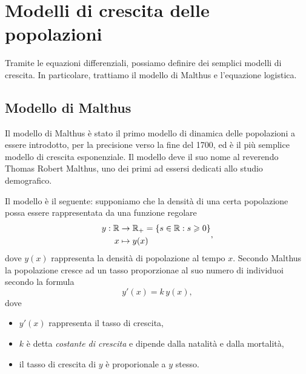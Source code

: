 \documentclass[../../analisi2]{subfiles}
\begin{document}
    \chapter{Modelli di crescita delle popolazioni}

        Tramite le equazioni differenziali, possiamo definire dei semplici modelli di crescita. In particolare, trattiamo il modello
        di Malthus e l'equazione logistica.

        \section{Modello di Malthus}

            Il modello di Malthus è stato il primo modello di dinamica delle popolazioni a essere introdotto, per la precisione verso la
            fine del 1700, ed è il più semplice modello di crescita esponenziale. Il modello deve il suo nome al reverendo Thomas Robert
            Malthus, uno dei primi ad essersi dedicati allo studio demografico.

            Il modello è il seguente: supponiamo che la densità di una certa popolazione possa essere rappresentata da una funzione
            regolare
            \[
                \begin{aligned}
                    y : \mathbb{R} &\to \mathbb{R}_+ = \left\{ s \in \mathbb{R} : s \geqslant 0\right\}\\
                    x &\mapsto y(x)
                \end{aligned}
                ,
            \]
            dove \(y(x)\) rappresenta la densità di popolazione al tempo \(x\). Secondo Malthus la popolazione cresce ad un tasso
            proporzionae al suo numero di individuoi secondo la formula
            \[
                y'(x) = k \, y(x),
            \]
            dove
            \begin{itemize}
                \item \(y'(x)\) rappresenta il tasso di crescita,
                \item \(k\) è detta \emph{costante di crescita} e dipende dalla natalità e dalla mortalità,
                \item il tasso di crescita di \(y\) è proporionale a \(y\) stesso.
            \end{itemize}
\end{document}
